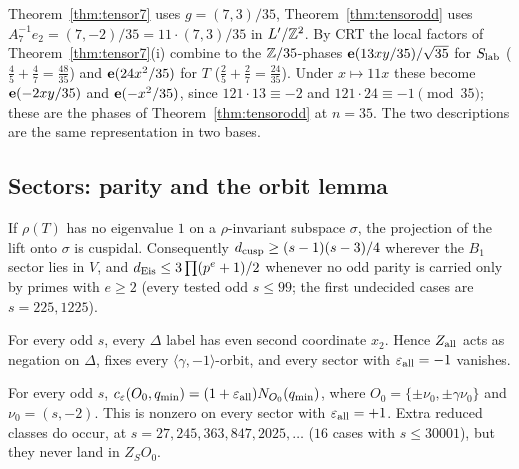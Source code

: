 \begin{remark}[The two generators at $s=7$]\label{rem:gen}
Theorem~\ref{thm:tensor7} uses $g=(7,3)/35$, Theorem~\ref{thm:tensorodd} uses $A_7^{-1}e_2=(7,-2)/35=11\cdot(7,3)/35$ in $L'/\mathbb{Z}^2$. By CRT the
local factors of Theorem~\ref{thm:tensor7}(i) combine to the $\mathbb{Z}/35$-phases $\mathbf{e}(13xy/35)/\sqrt{35}$ for $S_{\rm lab}$ ($\tfrac45+\tfrac47=\tfrac{48}{35}$) and
$\mathbf{e}(24x^2/35)$ for $T$ ($\tfrac25+\tfrac27=\tfrac{24}{35}$). Under $x\mapsto11x$ these become $\mathbf{e}(-2xy/35)$ and $\mathbf{e}(-x^2/35)$, since $121\cdot13\equiv-2$ and
$121\cdot24\equiv-1\pmod{35}$; these are the phases of Theorem~\ref{thm:tensorodd} at $n=35$. The two descriptions are the same representation in two bases.
\end{remark}

\subsection{Sectors: parity and the orbit lemma}\label{sec:sectors}
\begin{proposition}\label{prop:oddcusp5}
If $\rho(T)$ has no eigenvalue $1$ on a $\rho$-invariant subspace $\sigma$, the projection of the lift onto $\sigma$ is cuspidal. Consequently $d_{\rm cusp}\ge(s-1)(s-3)/4$ wherever the $B_1$ sector lies in $V$, and
$d_{\rm Eis}\le3\prod(p^e+1)/2$ whenever no odd parity is carried only by primes with $e\ge2$ (every tested odd $s\le99$; the first undecided cases are $s=225,1225$).
\end{proposition}
\begin{proposition}\label{prop:parity5}
For every odd $s$, every $\Delta$ label has even second coordinate $x_2$. Hence $Z_{\rm all}$ acts as negation on $\Delta$, fixes every $\langle\gamma,-1\rangle$-orbit, and every sector with $\varepsilon_{\rm all}=-1$ vanishes.
\end{proposition}
\begin{proposition}\label{prop:orbit5}
For every odd $s$, $c_\varepsilon(O_0,q_{\min})=(1+\varepsilon_{\rm all})N_{O_0}(q_{\min})$, where $O_0=\{\pm\nu_0,\pm\gamma\nu_0\}$ and $\nu_0=(s,-2)$. This is nonzero on every sector with $\varepsilon_{\rm all}=+1$. Extra reduced classes do occur, at $s=27,245,363,847,2025,\dots$ ($16$ cases with $s\le30001$), but they never land in $Z_SO_0$.
\end{proposition}
